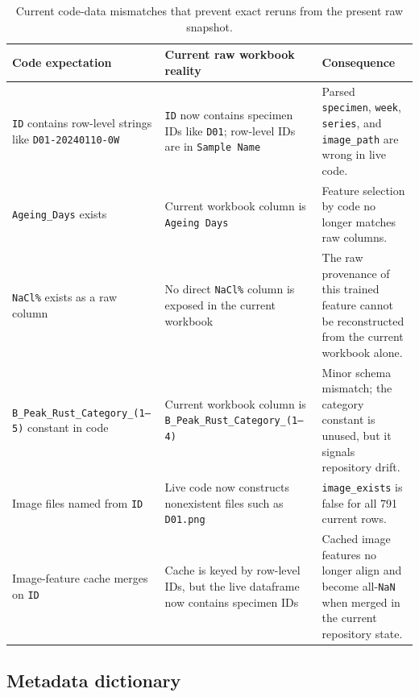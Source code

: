 \documentclass[11pt]{article}
\begin{document}
\begin{table}[H]
\centering
\small
\begin{tabularx}{\textwidth}{p{} p{} Y}
\toprule
\textbf{Code expectation} & \textbf{Current raw workbook reality} & \textbf{Consequence} \\
\midrule
\texttt{ID} contains row-level strings like \texttt{D01-20240110-0W} & \texttt{ID} now contains specimen IDs like \texttt{D01}; row-level IDs are in \texttt{Sample Name} & Parsed \texttt{specimen}, \texttt{week}, \texttt{series}, and \texttt{image\_path} are wrong in live code. \\
\texttt{Ageing\_Days} exists & Current workbook column is \texttt{Ageing Days} & Feature selection by code no longer matches raw columns. \\
\texttt{NaCl\%} exists as a raw column & No direct \texttt{NaCl\%} column is exposed in the current workbook & The raw provenance of this trained feature cannot be reconstructed from the current workbook alone. \\
\texttt{B\_Peak\_Rust\_Category\_(1--5)} constant in code & Current workbook column is \texttt{B\_Peak\_Rust\_Category\_(1--4)} & Minor schema mismatch; the category constant is unused, but it signals repository drift. \\
Image files named from \texttt{ID} & Live code now constructs nonexistent files such as \texttt{D01.png} & \texttt{image\_exists} is false for all 791 current rows. \\
Image-feature cache merges on \texttt{ID} & Cache is keyed by row-level IDs, but the live dataframe now contains specimen IDs & Cached image features no longer align and become all-\texttt{NaN} when merged in the current repository state. \\
\bottomrule
\end{tabularx}
\caption{Current code-data mismatches that prevent exact reruns from the present raw snapshot.}
\label{tab:code_data_mismatch}
\end{table}

\subsection{Metadata dictionary}
\end{document}

